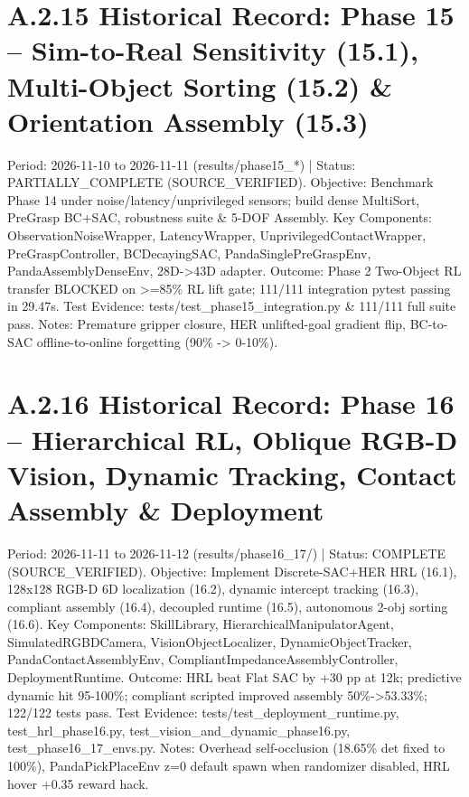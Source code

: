 \documentclass[11pt,a4paper,oneside]{book}
\begin{document}
\section{A.2.15 Historical Record: Phase 15 -- Sim-to-Real Sensitivity (15.1), Multi-Object Sorting (15.2) \& Orientation Assembly (15.3)}
Period: 2026-11-10 to 2026-11-11 (results/phase15\_*) | Status: PARTIALLY\_COMPLETE (SOURCE\_VERIFIED). Objective: Benchmark Phase 14 under noise/latency/unprivileged sensors; build dense MultiSort, PreGrasp BC+SAC, robustness suite \& 5-DOF Assembly. Key Components: ObservationNoiseWrapper, LatencyWrapper, UnprivilegedContactWrapper, PreGraspController, BCDecayingSAC, PandaSinglePreGraspEnv, PandaAssemblyDenseEnv, 28D->43D adapter. Outcome: Phase 2 Two-Object RL transfer BLOCKED on >=85\% RL lift gate; 111/111 integration pytest passing in 29.47s. Test Evidence: tests/test\_phase15\_integration.py \& 111/111 full suite pass. Notes: Premature gripper closure, HER unlifted-goal gradient flip, BC-to-SAC offline-to-online forgetting (90\% -> 0-10\%).

\section{A.2.16 Historical Record: Phase 16 -- Hierarchical RL, Oblique RGB-D Vision, Dynamic Tracking, Contact Assembly \& Deployment}
Period: 2026-11-11 to 2026-11-12 (results/phase16\_17/) | Status: COMPLETE (SOURCE\_VERIFIED). Objective: Implement Discrete-SAC+HER HRL (16.1), 128x128 RGB-D 6D localization (16.2), dynamic intercept tracking (16.3), compliant assembly (16.4), decoupled runtime (16.5), autonomous 2-obj sorting (16.6). Key Components: SkillLibrary, HierarchicalManipulatorAgent, SimulatedRGBDCamera, VisionObjectLocalizer, DynamicObjectTracker, PandaContactAssemblyEnv, CompliantImpedanceAssemblyController, DeploymentRuntime. Outcome: HRL beat Flat SAC by +30 pp at 12k; predictive dynamic hit 95-100\%; compliant scripted improved assembly 50\%->53.33\%; 122/122 tests pass. Test Evidence: tests/test\_deployment\_runtime.py, test\_hrl\_phase16.py, test\_vision\_and\_dynamic\_phase16.py, test\_phase16\_17\_envs.py. Notes: Overhead self-occlusion (18.65\% det fixed to 100\%), PandaPickPlaceEnv z=0 default spawn when randomizer disabled, HRL hover +0.35 reward hack.
\end{document}
